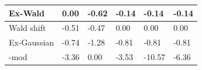 \begin{tabular}{|l|l|l|l|l|l|}
\hline
Ex-Wald&0.00&-0.62&-0.14&-0.14&-0.14\\\hline
Wald shift&-0.51&-0.47&0.00&0.00&0.00\\\hline
Ex-Gaussian&-0.74&-1.28&-0.81&-0.81&-0.81\\\hline
\rocdd{}-mod&-3.36&0.00&-3.53&-10.57&-6.36\\\hline
\end{tabular}
